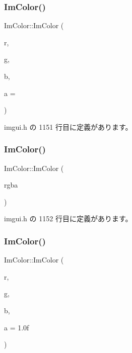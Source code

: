 \subsubsection{\texorpdfstring{Im\+Color()}{ImColor()}\hspace{0.1cm}{\footnotesize\ttfamily [2/5]}}
{\footnotesize\ttfamily Im\+Color\+::\+Im\+Color (\begin{DoxyParamCaption}\item[{int}]{r,  }\item[{int}]{g,  }\item[{int}]{b,  }\item[{int}]{a = {} }\end{DoxyParamCaption})\hspace{0.3cm}{\ttfamily [inline]}}



 imgui.\+h の 1151 行目に定義があります。

\mbox{\label{struct_im_color_ad306332841a2b1f903f40262a19f9412}} 
\subsubsection{\texorpdfstring{Im\+Color()}{ImColor()}\hspace{0.1cm}{\footnotesize\ttfamily [3/5]}}
{\footnotesize\ttfamily Im\+Color\+::\+Im\+Color (\begin{DoxyParamCaption}\item[{\mbox{\hyperlink{imgui_8h_a118cff4eeb8d00e7d07ce3d6460eed36}{Im\+U32}}}]{rgba }\end{DoxyParamCaption})\hspace{0.3cm}{\ttfamily [inline]}}



 imgui.\+h の 1152 行目に定義があります。

\mbox{\label{struct_im_color_a92b53917ca9d90a7207b18270ff5453d}} 
\subsubsection{\texorpdfstring{Im\+Color()}{ImColor()}\hspace{0.1cm}{\footnotesize\ttfamily [4/5]}}
{\footnotesize\ttfamily Im\+Color\+::\+Im\+Color (\begin{DoxyParamCaption}\item[{float}]{r,  }\item[{float}]{g,  }\item[{float}]{b,  }\item[{float}]{a = {\ttfamily 1.0f} }\end{DoxyParamCaption})\hspace{0.3cm}{\ttfamily [inline]}}



